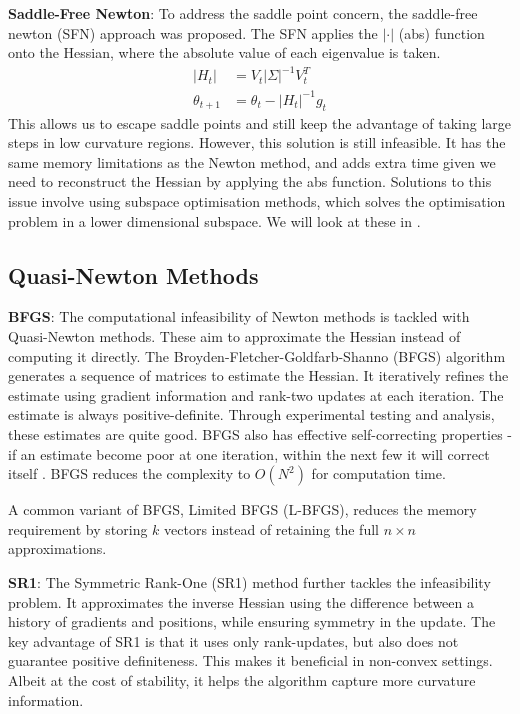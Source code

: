 \textbf{Saddle-Free Newton}: To address the saddle point concern, the saddle-free newton (SFN) approach was proposed. The SFN applies the $|\cdot|$ (abs) function onto the Hessian, where the absolute value of each eigenvalue is taken.
\begin{align}
    |H_t| &= V_{t} |\Sigma|^{-1} V_{t}^T \\
    \theta_{t+1} &= \theta_t - |H_t|^{-1} g_t
\end{align}
This allows us to escape saddle points and still keep the advantage of taking large steps in low curvature regions. However, this solution is still infeasible. It has the same memory limitations as the Newton method, and adds extra time given we need to reconstruct the Hessian by applying the abs function. Solutions to this issue involve using subspace optimisation methods, which solves the optimisation problem in a lower dimensional subspace. We will look at these in .

\subsection{Quasi-Newton Methods}
\textbf{BFGS}: The computational infeasibility of Newton methods is tackled with Quasi-Newton methods. These aim to approximate the Hessian instead of computing it directly. The Broyden-Fletcher-Goldfarb-Shanno (BFGS) algorithm generates a sequence of matrices to estimate the Hessian. It iteratively refines the estimate using gradient information and rank-two updates at each iteration. The estimate is always positive-definite. Through experimental testing and analysis, these estimates are quite good. BFGS also has effective self-correcting properties - if an estimate become poor at one iteration, within the next few it will correct itself \citep{NoceWrig06}. BFGS reduces the complexity to $O(N^2)$ for computation time.  

A common variant of BFGS, Limited BFGS (L-BFGS), reduces the memory requirement by storing $k$ vectors instead of retaining the full $n\times n$ approximations.

\textbf{SR1}: The Symmetric Rank-One (SR1) method further tackles the infeasibility problem. It approximates the inverse Hessian using the difference between a history of gradients and positions, while ensuring symmetry in the update. The key advantage of SR1 is that it uses only rank-updates, but also does not guarantee positive definiteness. This makes it beneficial in non-convex settings. Albeit at the cost of stability, it helps the algorithm capture more curvature information.

